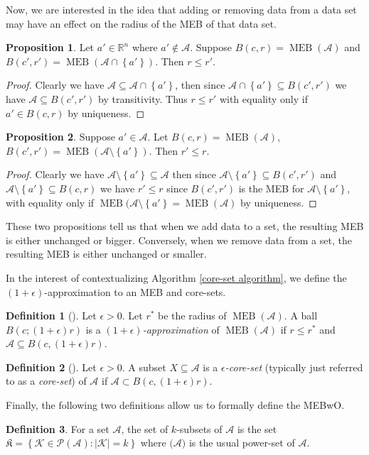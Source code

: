 \documentclass[11pt,twoside]{report}
\newcommand{\A}{\mathcal{A}} %
\newcommand{\K}{\mathcal{K}}
\DeclareMathOperator{\MEB}{MEB}
\theoremstyle{definition}
\newtheorem{definition}{Definition}
\newtheorem{proposition}{Proposition}
\numberwithin{theorem}{section}
\numberwithin{definition}{section}
\numberwithin{lemma}{section}
\numberwithin{proposition}{section}
\numberwithin{equation}{section}
\numberwithin{figure}{section}
\begin{document}
Now, we are interested in the idea that adding or removing data from a data set may have an effect on the radius of the MEB of that data set.
\begin{proposition}\label{adding data}
    Let $a'\in\mathbb{R}^n$ where $a'\notin\A$. Suppose $B(c,r)=\MEB(\A)$ and $B(c',r')=\MEB(\A\cap\left\{a'\right\})$. Then $r\leq r'$.
\end{proposition}
\begin{proof}
    Clearly we have $\A\subseteq\A\cap\left\{a'\right\}$, then since $\A\cap\left\{a'\right\}\subseteq B(c',r')$ we have $\mathcal{A}\subseteq B(c',r')$ by transitivity. Thus $r\leq r'$ with equality only if $a'\in B(c,r)$ by uniqueness.
\end{proof}

\begin{proposition}\label{removing data}
    Suppose $a'\in\A$. Let $B(c,r)=\MEB(\A)$, $B(c',r')=\MEB(\A\setminus\left\{a'\right\})$. Then $r'\leq r$.
\end{proposition}
\begin{proof}
    Clearly we have $\A\setminus\left\{a'\right\}\subseteq\A$ then since $\A\setminus\left\{a'\right\}\subseteq B(c',r')$ and $\A\setminus\left\{a'\right\}\subseteq B(c,r)$ we have $r'\leq r$ since $B(c',r')$ is the MEB for $\A\setminus\left\{a'\right\}$, with equality only if $\MEB(\A\setminus\left\{a'\right\} = \MEB(\A)$ by uniqueness.
\end{proof}
These two propositions tell us that when we add data to a set, the resulting MEB is either unchanged or bigger. Conversely, when we remove data from a set, the resulting MEB is either unchanged or smaller.

In the interest of contextualizing Algorithm \ref{core-set algorithm}, we define the $(1+\epsilon)$-approximation to an MEB and core-sets.
\begin{definition}[{{\cite[page 2]{core-sets}}}]
    Let $\epsilon>0$. Let $r^*$ be the radius of $\MEB(\A)$. A ball $B(c;(1+\epsilon)r)$ is a \textit{$(1+\epsilon)$-approximation} of $\MEB(\A)$ if $r\leq r^*$ and $\mathcal{A}\subseteq B(c,(1+\epsilon)r)$.
\end{definition}

\begin{definition}[{{\cite[page 2]{core-sets}}}]
    Let $\epsilon>0$. A subset $X\subseteq\A$ is a \textit{$\epsilon$-core-set} (typically just referred to as a \textit{core-set}) of $\A$ if $\A\subset B(c,(1+\epsilon)r)$.
\end{definition}
Finally, the following two definitions allow us to formally define the MEBwO.
\begin{definition}
    For a set $\A$, the set of $k$-subsets of $\A$ is the set $\mathfrak{K}=\left\{\K\in\mathscr{P}(\A): |\K|=k\right\}$ where $\mathscr(\A)$ is the usual power-set of $\A$.
\end{definition}
\end{document}
